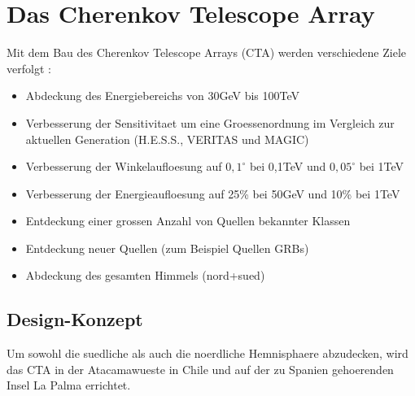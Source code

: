 \chapter{Das Cherenkov Telescope Array}
Mit dem Bau des Cherenkov Telescope Arrays (CTA) werden verschiedene Ziele verfolgt \cite{NextGen}:
\begin{itemize}

\item Abdeckung des Energiebereichs von 30GeV bis 100TeV
\item Verbesserung der Sensitivitaet um eine Groessenordnung im Vergleich zur aktuellen Generation (H.E.S.S., VERITAS und MAGIC)
\item Verbesserung der Winkelaufloesung auf $0,1^{\circ}$ bei 0,1TeV und $0,05^{\circ}$ bei 1TeV
\item Verbesserung der Energieaufloesung auf 25\% bei 50GeV und 10\% bei 1TeV
\item Entdeckung einer grossen Anzahl von Quellen bekannter Klassen
\item Entdeckung neuer Quellen (zum Beispiel Quellen GRBs)
\item Abdeckung des gesamten Himmels (nord+sued)
\end{itemize}

\section{Design-Konzept}
Um sowohl die suedliche als auch die noerdliche Hemnisphaere abzudecken, wird das CTA in der Atacamawueste in Chile und auf der zu Spanien gehoerenden Insel La Palma errichtet.
